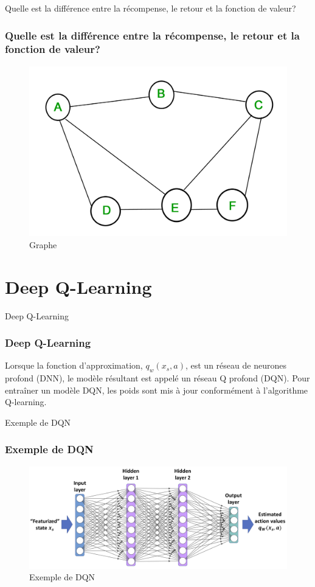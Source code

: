 \documentclass[serif, aspectratio=169]{beamer}
\begin{document}
\begin{frame}{Quelle est la différence entre la récompense, le retour et la fonction de valeur?}
	\frametitle{Quelle est la différence entre la récompense, le retour et la fonction de valeur?}
	
	\begin{figure}[htpb]
		\centering
		\includegraphics[keepaspectratio, scale=0.2]{images/graph.jpg}
		\caption{Graphe}
	\end{figure}
	
\end{frame}


\section{Deep Q-Learning}

\begin{frame}{Deep Q-Learning}
	\frametitle{Deep Q-Learning}
	
	Lorsque la fonction d'approximation, \( q_w(x_s, a) \), est un réseau de neurones profond (DNN), le modèle résultant est appelé un réseau Q profond (DQN). Pour entraîner un modèle DQN, les poids sont mis à jour conformément à l'algorithme Q-learning.
	
\end{frame}

\begin{frame}{Exemple de DQN}
	\frametitle{Exemple de DQN}
	
	\begin{figure}[htpb]
		\centering
		\includegraphics[keepaspectratio, scale=0.55]{images/dqn.png}
		\caption{Exemple de DQN}
	\end{figure}
	
\end{frame}
\end{document}
